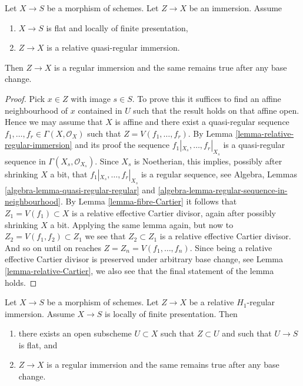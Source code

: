 \begin{lemma}
\label{lemma-relative-regular-immersion-flat-in-neighbourhood}
Let $X \to S$ be a morphism of schemes.
Let $Z \to X$ be an immersion.
Assume
\begin{enumerate}
\item $X \to S$ is flat and locally of finite presentation,
\item $Z \to X$ is a relative quasi-regular immersion.
\end{enumerate}
Then $Z \to X$ is a regular immersion and
the same remains true after any base change.
\end{lemma}

\begin{proof}
Pick $x \in Z$ with image $s \in S$. To prove this it suffices to
find an affine neighbourhood of $x$ contained in $U$ such that the
result holds on that affine open. Hence we may assume that $X$ is affine
and there exist a quasi-regular sequence
$f_1, \ldots, f_r \in \Gamma(X, \mathcal{O}_X)$
such that $Z = V(f_1, \ldots, f_r)$. By
Lemma \ref{lemma-relative-regular-immersion}
and its proof the sequence $f_1|_{X_s}, \ldots, f_r|_{X_s}$ is a
quasi-regular sequence in $\Gamma(X_s, \mathcal{O}_{X_s})$.
Since $X_s$ is Noetherian, this implies, possibly after shrinking
$X$ a bit, that $f_1|_{X_s}, \ldots, f_r|_{X_s}$ is a regular
sequence, see
Algebra, Lemmas \ref{algebra-lemma-quasi-regular-regular} and
\ref{algebra-lemma-regular-sequence-in-neighbourhood}.
By
Lemma \ref{lemma-fibre-Cartier}
it follows that $Z_1 = V(f_1) \subset X$ is a relative effective
Cartier divisor, again after possibly shrinking $X$ a bit.
Applying the same lemma again, but now to $Z_2 = V(f_1, f_2) \subset Z_1$
we see that $Z_2 \subset Z_1$ is a relative effective Cartier divisor.
And so on until on reaches $Z = Z_n = V(f_1, \ldots, f_n)$.
Since being a relative effective Cartier divisor is preserved under
arbitrary base change, see
Lemma \ref{lemma-relative-Cartier},
we also see that the final statement of the lemma holds.
\end{proof}

\begin{lemma}
\label{lemma-flat-relative-H1-regular}
Let $X \to S$ be a morphism of schemes.
Let $Z \to X$ be a relative $H_1$-regular immersion.
Assume $X \to S$ is locally of finite presentation. Then
\begin{enumerate}
\item there exists an open subscheme $U \subset X$ such that
$Z \subset U$ and such that $U \to S$ is flat, and
\item $Z \to X$ is a regular immersion and the same remains
true after any base change.
\end{enumerate}
\end{lemma}

